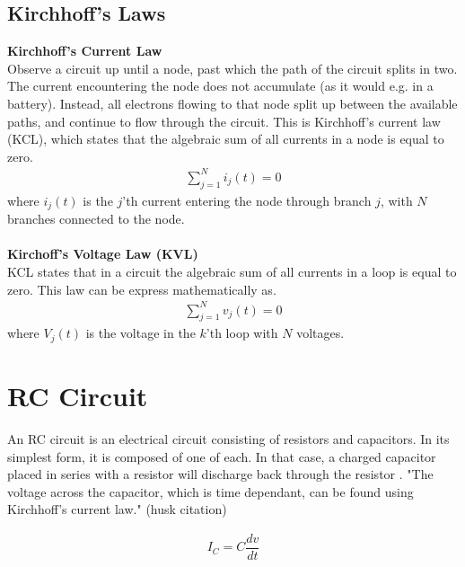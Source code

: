 \subsection{Kirchhoff's Laws}
\textbf{Kirchhoff's Current Law}
\\
Observe a circuit up until a node, past which the path of the circuit splits in two. The current encountering the node does not accumulate (as it would e.g. in a battery). Instead, all electrons flowing to that node split up between the available paths, and continue to flow through the circuit. This is Kirchhoff’s current law (KCL), which states that the algebraic sum of all currents in a node is equal to zero. 
\begin{align}
\sum_{j=1}^{N} i_{j}(t) = 0
\end{align}
where $i_{j}(t)$ is the $j$'th current entering the node through branch $j$, with $N$ branches connected to the node. \cite[page~32]{bcircuit}
\\
\\
\textbf{Kirchoff's Voltage Law (KVL)}
\\
KCL states that in a circuit the algebraic sum of all currents in a loop is equal to zero. This law can be express mathematically  as.
\begin{align}
\sum_{j=1}^{N} v_{j}(t) = 0
\end{align}
where $V_{j}(t)$ is the voltage in the $k$'th loop with $N$ voltages.\citep[page~34]{bcircuit}\\

\section{RC Circuit}
An RC circuit is an electrical circuit consisting of resistors and capacitors. In its simplest form, it is composed of one of each. In that case, a charged capacitor placed in series with a resistor will discharge back through the resistor \cite[p~21]{artof}. "The voltage across the capacitor, which is time dependant, can be found using Kirchhoff's current law." (husk citation)

\begin{figure}[H]
 
\end{figure}

\begin{align}\label{I_C}
I_{C}= C \dfrac{dv}{dt}
\end{align}
